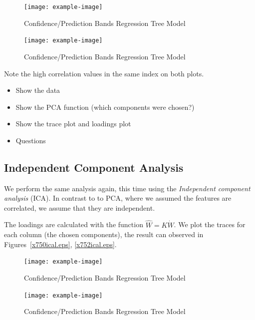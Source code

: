 \documentclass[a4paper, twocolumn]{article}
\begin{document}
        \begin{figure}[h!]
            \centering
            \caption{Confidence/Prediction Bands Regression Tree Model}
            \label{fig:x750tp.eps}
            \texttt{[image: example-image]}
        \end{figure}

        \begin{figure}[h!]
            \centering
            \caption{Confidence/Prediction Bands Regression Tree Model}
            \label{fig:x752tp.eps}
            \texttt{[image: example-image]}
        \end{figure}

        Note the high correlation values in the same index on both plots.

        \begin{itemize}
            \item Show the data 
            \item Show the PCA function (which components were chosen?)
            \item Show the trace plot and loadings plot
            \item Questions
        \end{itemize}

    \subsection*{Independent Component Analysis}

        We perform the same analysis again, this time using the \emph{Independent component analysis} (ICA). In contrast to to PCA, where we assumed the features are correlated, we assume that they are independent. 

        The loadings are calculated with the function \( \hat{W} = K \dot W \). We plot the traces for each column (the chosen components), the result can observed in Figures~\ref{x750ical.eps}, \ref{x752ical.eps}.

        \begin{figure}[h!]
            \centering
            \caption{Confidence/Prediction Bands Regression Tree Model}
            \label{fig:x750ical.eps}
            \texttt{[image: example-image]}
        \end{figure}

        \begin{figure}[h!]
            \centering
            \caption{Confidence/Prediction Bands Regression Tree Model}
            \label{fig:x752ical.eps}
            \texttt{[image: example-image]}
        \end{figure}
\end{document}
